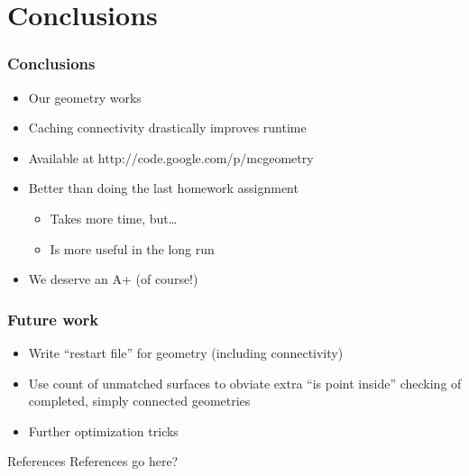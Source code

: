 \documentclass{beamer}
\begin{document}
\section{Conclusions}

\begin{frame}
  \frametitle{Conclusions}
  \begin{itemize}
	 \item Our geometry works
   \item Caching connectivity drastically improves runtime
   
     \item Available at http://code.google.com/p/mcgeometry
     \item Better than doing the last homework assignment
         \begin{itemize}
             \item Takes more time, but\dots
             \item Is more useful in the long run
         \end{itemize}
	 \item We deserve an A+ (of course!)
  \end{itemize}
\end{frame}

\begin{frame}
  \frametitle{Future work}
  \begin{itemize}
	 \item Write ``restart file'' for geometry (including connectivity)
   \item Use count of unmatched surfaces to obviate extra ``is point inside''
     checking of completed, simply connected geometries
   \item Further optimization tricks
  \end{itemize}
\end{frame}

\appendix
\begin{frame}{References}
  References go here?
\end{frame}
\end{document}
